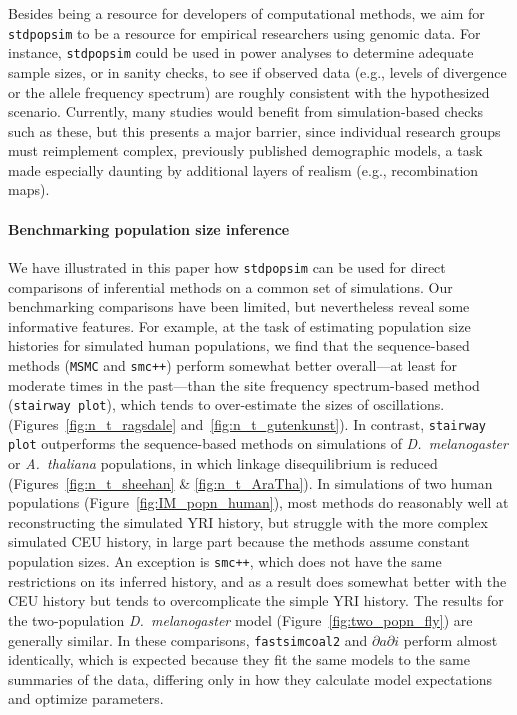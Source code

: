 \documentclass[12pt,halfline,a4paper]{ouparticle}
\newcommand{\stdpopsim}{\texttt{stdpopsim}\xspace}
\newcommand{\dadi}{$\partial a \partial i$\xspace}
\newcommand{\MSMC}{\texttt{MSMC}\xspace}
\newcommand{\smcpp}{\texttt{smc++}\xspace}
\newcommand{\stairwayplot}{\texttt{stairway plot}\xspace}
\newcommand{\fastsimcoal}{\texttt{fastsimcoal2}\xspace}
\begin{document}
Besides being a resource for developers of computational methods,
we aim for \stdpopsim to be a resource for empirical researchers using genomic data.
For instance, \stdpopsim could be used in power analyses to determine adequate sample sizes,
or in sanity checks, to see if observed data
(e.g., levels of divergence or the allele frequency spectrum)
are roughly consistent with the hypothesized scenario.
Currently, many studies would benefit from simulation-based checks such as these,
but this presents a major barrier,
since individual research groups must reimplement complex, previously published demographic models,
a task made especially daunting by additional layers of realism (e.g., recombination maps).

\paragraph{Benchmarking population size inference}
We have illustrated in this paper how \stdpopsim can be used for direct
comparisons of inferential methods on a common set of simulations. Our
benchmarking comparisons have been limited, but nevertheless
reveal some informative features.
For example, at the task of estimating population size histories for simulated human
populations, we find that the sequence-based methods (\MSMC and \smcpp)
perform somewhat better overall---at least for moderate times in the past---than
the site frequency spectrum-based method (\stairwayplot),
which tends to over-estimate the sizes of oscillations.
(Figures~\ref{fig:n_t_ragsdale} and~\ref{fig:n_t_gutenkunst}).
In contrast, \stairwayplot outperforms the sequence-based methods
on simulations of \textit{D.~melanogaster} or \textit{A.~thaliana} populations,
in which linkage disequilibrium is reduced (Figures~\ref{fig:n_t_sheehan} \& \ref{fig:n_t_AraTha}).
In simulations of two human populations
(Figure~\ref{fig:IM_popn_human}), most methods do reasonably well at
reconstructing the simulated YRI history, but struggle with the more complex simulated CEU
history, in large part because the methods assume constant population sizes.
An exception is \smcpp, which does not have the same
restrictions on its inferred history, and as a result does somewhat better
with the CEU history but tends to overcomplicate the simple YRI history.
The results for
the two-population \textit{D.~melanogaster} model (Figure~\ref{fig:two_popn_fly})
are generally similar.
In these comparisons, \fastsimcoal and \dadi perform almost identically, which is expected because they fit the same models to the same summaries of the data, differing only in how they calculate model expectations and optimize parameters.
\end{document}
